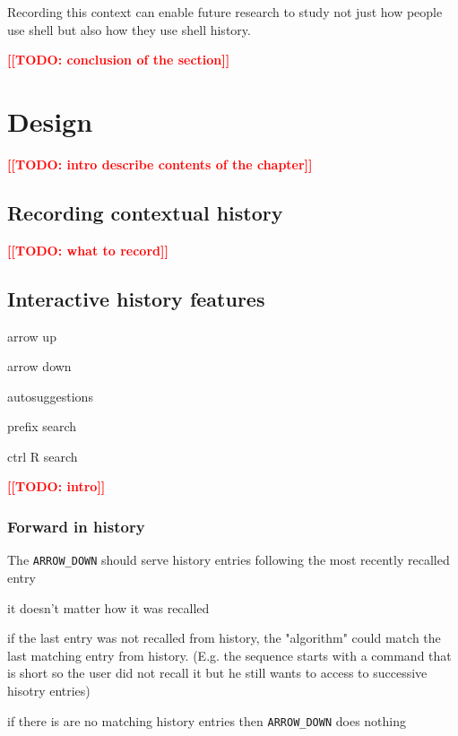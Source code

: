 \documentclass[thesis=M,english]{FITthesis}[2012/10/20]
\newcommand{\blind}[1][1]{}
\newcommand{\todotext}[1]{\textcolor{red}{\textbf{[[#1]]}}}
\begin{document}
Recording this context can enable future research to study not just how people use shell but also how they use shell history.

\todotext{TODO: conclusion of the section}



\chapter{Design}
\todotext{TODO: intro describe contents of the chapter}

\blind
{}
\section{Recording contextual history}

\todotext{TODO: what to record}

\blind[2]

\section{Interactive history features} %


arrow up

arrow down

autosuggestions

prefix search

ctrl R search

\todotext{TODO: intro}

\blind

\subsection{Forward in history}


The \verb|ARROW_DOWN| should serve history entries following the most recently recalled entry

it doesn't matter how it was recalled

if the last entry was not recalled from history, the "algorithm" could match the last matching entry from history. (E.g. the sequence starts with a command that is short so the user did not recall it but he still wants to access to successive hisotry entries)

if there is are no matching history entries then \verb|ARROW_DOWN| does nothing
\end{document}
